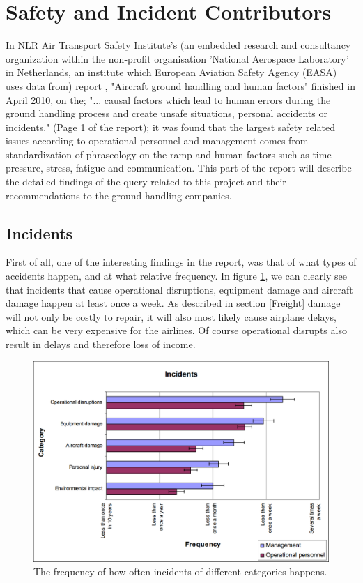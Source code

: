 \section{Safety and Incident Contributors}
In NLR Air Transport Safety Institute's (an embedded research and consultancy organization within the non-profit organisation 'National Aerospace Laboratory' in Netherlands, an institute which European Aviation Safety Agency (EASA) uses data from) report \cite{NLR_human_factors}, "Aircraft ground handling and human factors" finished in April 2010, on the; "... causal factors which lead to human errors during the ground handling process and create unsafe situations, personal accidents or incidents." (Page 1 of the report); it was found that the largest safety related issues according to operational personnel and management comes from standardization of phraseology on the ramp and human factors such as time pressure, stress, fatigue and communication. This part of the report will describe the detailed findings of the query related to this project and their recommendations to the ground handling companies.

\subsection{Incidents}
First of all, one of the interesting findings in the report, was that of what types of accidents happen, and at what relative frequency. In figure \ref{FrequencyOfIncidents}, we can clearly see that incidents that cause operational disruptions, equipment damage and aircraft damage happen at least once a week. As described in section [Freight] damage will not only be costly to repair, it will also most likely cause airplane delays, which can be very expensive for the airlines. Of course operational disrupts also result in delays and therefore loss of income.

\begin{figure}[H]
\centering
\includegraphics[width=\textwidth]{Grafik/FrequencyOfIncidents}
\caption{The frequency of how often incidents of different categories happens.}
\label{FrequencyOfIncidents}
\end{figure}

